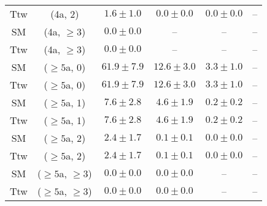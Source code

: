\begin{table}[h!]
{\begin{tabular}{cccccc}
	Ttw & (4a, 2) & $1.6\pm 1.0$ & $0.0\pm 0.0$ & $0.0\pm 0.0$ & -- \\[0.5ex] 
	SM & (4a, $\ge3$) & $0.0\pm 0.0$ & -- & -- & -- \\[0.5ex] 
	Ttw & (4a, $\ge3$) & $0.0\pm 0.0$ & -- & -- & -- \\[0.5ex] 
	SM & ($\ge5$a, 0) & $61.9\pm 7.9$ & $12.6\pm 3.0$ & $3.3\pm 1.0$ & -- \\[0.5ex] 
	Ttw & ($\ge5$a, 0) & $61.9\pm 7.9$ & $12.6\pm 3.0$ & $3.3\pm 1.0$ & -- \\[0.5ex] 
	SM & ($\ge5$a, 1) & $7.6\pm 2.8$ & $4.6\pm 1.9$ & $0.2\pm 0.2$ & -- \\[0.5ex] 
	Ttw & ($\ge5$a, 1) & $7.6\pm 2.8$ & $4.6\pm 1.9$ & $0.2\pm 0.2$ & -- \\[0.5ex] 
	SM & ($\ge5$a, 2) & $2.4\pm 1.7$ & $0.1\pm 0.1$ & $0.0\pm 0.0$ & -- \\[0.5ex] 
	Ttw & ($\ge5$a, 2) & $2.4\pm 1.7$ & $0.1\pm 0.1$ & $0.0\pm 0.0$ & -- \\[0.5ex] 
	SM & ($\ge5$a, $\ge3$) & $0.0\pm 0.0$ & $0.0\pm 0.0$ & -- & -- \\[0.5ex] 
	Ttw & ($\ge5$a, $\ge3$) & $0.0\pm 0.0$ & $0.0\pm 0.0$ & -- & -- \\[0.5ex] 
	\hline
	\hline
\end{tabular}}
\end{table}
